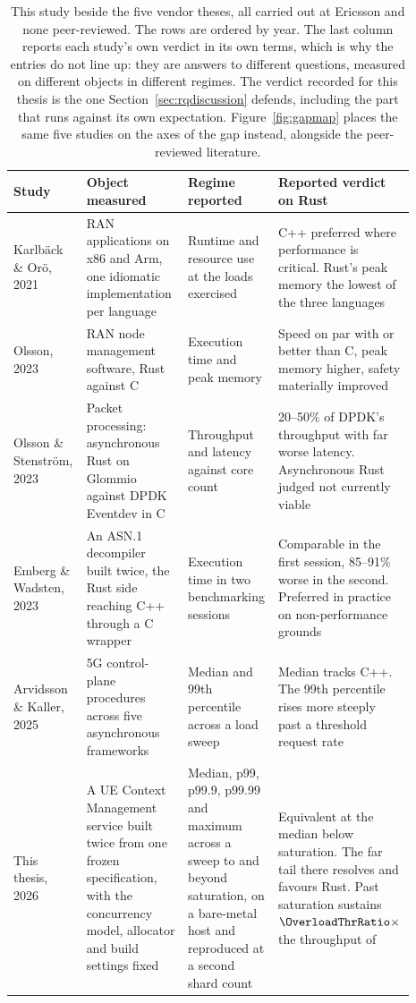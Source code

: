 \begin{table}[tp]
\centering
\small
\caption[This study beside the five vendor theses]{This study beside the five vendor theses, all
carried out at Ericsson and none peer-reviewed. The rows are ordered by year. The last column
reports each study's own verdict in its own terms, which is why the entries do not line up: they
are answers to different questions, measured on different objects in different regimes. The
verdict recorded for this thesis is the one Section~\ref{sec:rqdiscussion} defends, including the
part that runs against its own expectation. Figure~\ref{fig:gapmap} places the same five studies on
the axes of the gap instead, alongside the peer-reviewed
literature.\label{tab:vendortheses}}
\renewcommand{\arraystretch}{1.2}
\begin{tabular}{@{}R{0.18\linewidth} R{0.25\linewidth} R{0.20\linewidth} R{0.26\linewidth}@{}}
\hline\hline
Study & Object measured & Regime reported & Reported verdict on Rust \\
\hline
Karlb\"ack \& Or\"o, 2021~\cite{karlback2021ran} &
RAN applications on x86 and Arm, one idiomatic implementation per language &
Runtime and resource use at the loads exercised &
C++ preferred where performance is critical. Rust's peak memory the lowest of the three
languages \\
Olsson, 2023~\cite{olsson2023ranmgmt} &
RAN node management software, Rust against C &
Execution time and peak memory &
Speed on par with or better than C, peak memory higher, safety materially improved \\
Olsson \& Stenstr\"om, 2023~\cite{olsson2023asyncpackets} &
Packet processing: asynchronous Rust on Glommio against DPDK Eventdev in C &
Throughput and latency against core count &
20--50\% of DPDK's throughput with far worse latency. Asynchronous Rust judged not currently
viable \\
Emberg \& Wadsten, 2023~\cite{emberg2023asn1} &
An {ASN.1} decompiler built twice, the Rust side reaching C++ through a C wrapper &
Execution time in two benchmarking sessions &
Comparable in the first session, 85--91\% worse in the second. Preferred in practice on
non-performance grounds \\
Arvidsson \& Kaller, 2025~\cite{arvidsson2025async} &
5G control-plane procedures across five asynchronous frameworks &
Median and 99th percentile across a load sweep &
Median tracks C++. The 99th percentile rises more steeply past a threshold request rate \\
\hline
This thesis, 2026 &
A UE Context Management service built twice from one frozen specification, with the concurrency
model, allocator and build settings fixed &
Median, p99, p99.9, p99.99 and maximum across a sweep to and beyond saturation, on a bare-metal
host and reproduced at a second shard count &
Equivalent at the median below saturation. The far tail there resolves and favours Rust. Past
saturation \OverloadSustainedFaster{} sustains
$\OverloadThrRatio\times$ the throughput of \OverloadSustainedSlower{} \\
\hline
\end{tabular}
\end{table}

